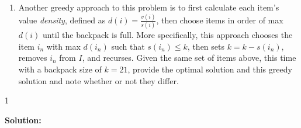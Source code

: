 \documentclass[9pt]{article}
\def\solutions{1}
\begin{document}
\begin{enumerate}
\item Another greedy approach to this problem is to first calculate each item's value \textit{density}, defined as $d(i) = \frac{v(i)}{s(i)}$, then choose items in order of max $d(i)$ until the backpack is full. More specifically, this approach chooses the item $i_n$ with max $d(i_n)$ such that $s(i_n) \leq k$, then sets $k = k - s(i_n)$, removes $i_n$ from $I$, and recurses. Given the same set of items above, this time with a backpack size of $k = 21$, provide the optimal solution and this greedy solution and note whether or not they differ.

\end{enumerate}

  \if\solutions1
  \vspace{2mm}
  
  \textbf{Solution:}   \\
\end{document}
